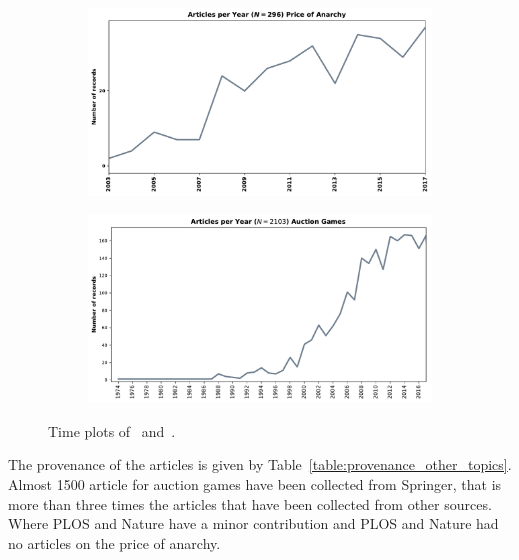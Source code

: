 \documentclass{article}
\begin{document}
\begin{center}
\begin{figure}[!hbtp]
    \begin{subfigure}{0.5\textwidth}
        \includegraphics[width=\textwidth]{./assets/images/anarchy_timeline.pdf}
    \end{subfigure}
    \begin{subfigure}{0.5\textwidth}
        \includegraphics[width=\textwidth]{./assets/images/auction_timeline.pdf}
    \end{subfigure}
\caption{Time plots of~\cite{} and~\cite{}.}
\label{fig:timeplots_other_topics}
\end{figure}
\end{center}

The provenance of the articles is given by Table~\ref{table:provenance_other_topics}.
Almost 1500 article for auction games have been collected from Springer, that is
more than three times the articles that have been collected from other sources.
Where PLOS and Nature have a minor contribution and PLOS and Nature had no
articles on the price of anarchy.
\end{document}
